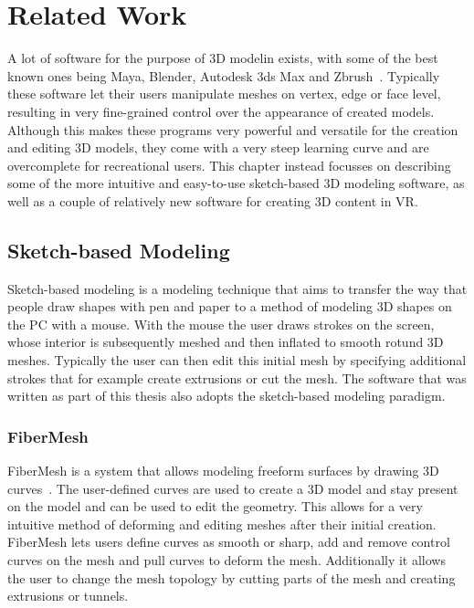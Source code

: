 
\chapter{Related Work}
\label{chap:related}
A lot of software for the purpose of 3D modelin exists, with some of the best known ones being Maya, Blender, Autodesk 3ds Max and Zbrush~\cite{Maya, Blender, 3dsMAX, ZBrush}. Typically these software let their users manipulate meshes on vertex, edge or face level, resulting in very fine-grained control over the appearance of created models. Although this makes these programs very powerful and versatile for the creation and editing 3D models, they come with a very steep learning curve and are overcomplete for recreational users. This chapter instead focusses on describing some of the more intuitive and easy-to-use sketch-based 3D modeling software, as well as a couple of relatively new software for creating 3D content in VR. 

\section{Sketch-based Modeling}
Sketch-based modeling is a modeling technique that aims to transfer the way that people draw shapes with pen and paper to a method of modeling 3D shapes on the PC with a mouse. With the mouse the user draws strokes on the screen, whose interior is subsequently meshed and then inflated to smooth rotund 3D meshes. Typically the user can then edit this initial mesh by specifying additional strokes that for example create extrusions or cut the mesh.
The software that was written as part of this thesis also adopts the sketch-based modeling paradigm. 


\subsection{FiberMesh}
\label{subsec:fiber}
FiberMesh is a system that allows modeling freeform surfaces by drawing 3D curves~\cite{Nealen2007}. The user-defined curves are used to create a 3D model and stay present on the model and can be used to edit the geometry. This allows for a very intuitive method of deforming and editing meshes after their initial creation. FiberMesh lets users define curves as smooth or sharp, add and remove control curves on the mesh and pull curves to deform the mesh. Additionally it allows the user to change the mesh topology by cutting parts of the mesh and creating extrusions or tunnels.

